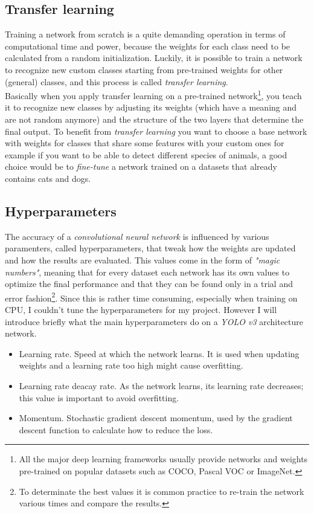 	\subsection{Transfer learning}
	Training a network from scratch is a quite demanding operation in terms of computational time and power, because the weights for each class need to be calculated from a random initialization. Luckily, it is possible to train a network to recognize new custom classes starting from pre-trained weights for other (general) classes, and this process is called \emph{transfer learning}. \\
	 Basically when you apply transfer learning on a pre-trained network\footnote{All the major deep learning frameworks usually provide networks and weights pre-trained on popular datasets such as COCO, Pascal VOC or ImageNet.}, you teach it to recognize new classes by adjusting its weights (which have a meaning and are not random anymore) and the structure of the two layers that determine the final output. To benefit from \emph{transfer learning}
	 you want to choose a base network with weights for classes that share some features with your custom ones for example if you want to be able to detect different species of animals, a good choice would be to \emph{fine-tune} a network trained on a datasets that already contains cats and dogs.
	
	\subsection{Hyperparameters}
	The accuracy of a \emph{convolutional neural network} is influenced by various paramenters, called hyperparameters, that tweak how the weights are updated and how the results are evaluated. This values come in the form of \emph{"magic numbers"}, meaning that for every dataset each network has its own values to optimize the final performance and that they can be found only in a trial and error fashion\footnote{To determinate the best values it is common practice to re-train the network various times and compare the results.}. Since this is rather time consuming, especially when training on CPU, I couldn't tune the hyperparameters for my project. However I will introduce briefly what the main hyperparameters do on a \emph{YOLO v3} architecture network.
	\begin{itemize}
	\item Learning rate. Speed at which the network learns. It is used when updating weights and a learning rate too high might cause overfitting.
	\item Learning rate deacay rate. As the network learns, its learning rate decreases; this value is important to avoid overfitting.
	\item Momentum. Stochastic gradient descent momentum, used by the gradient descent function to calculate how to reduce the loss.
	\end{itemize}

